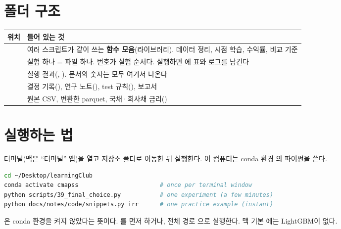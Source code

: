 \section{폴더 구조}
\begin{table}[H]\centering\small
\begin{tabularx}{\linewidth}{@{}p{38mm}L@{}}\toprule
위치 & 들어 있는 것\\\midrule
{} & 여러 스크립트가 같이 쓰는 \textbf{함수 모음}(라이브러리). 데이터 정리, 시점 학습, 수익률, 비교 기준\\
 & 실험 하나 = 파일 하나. 번호가 실험 순서다. 실행하면 에 표와 로그를 남긴다\\
 & 실행 결과(, ). 문서의 숫자는 모두 여기서 나온다\\
 & 결정 기록(), 연구 노트(), test 규칙(), 보고서\\
 & 원본 CSV, 변환한 parquet, 국채·\allowbreak{}회사채 금리()\\\bottomrule
\end{tabularx}
\end{table}

\section{실행하는 법}
터미널(맥은 ``터미널'' 앱)을 열고 저장소 폴더로 이동한 뒤 실행한다. 이 컴퓨터는 conda 환경 의 파이썬을 쓴다.
\begin{lstlisting}[language=bash,numbers=none]
cd ~/Desktop/learningClub
conda activate cmapss                       # once per terminal window
python scripts/39_final_choice.py           # one experiment (a few minutes)
python docs/notes/code/snippets.py irr      # one practice example (instant)
\end{lstlisting}
\begin{warnbox}
은 conda 환경을 켜지 않았다는 뜻이다. 를 먼저 하거나, 전체 경로 으로 실행한다. 맥 기본 에는 LightGBM이 없다.
\end{warnbox}

